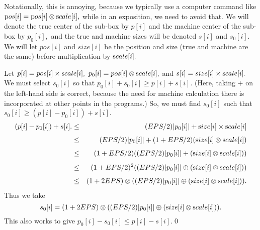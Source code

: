 Notationally, this is annoying, because we typically use a computer command like ${\textrm pos}[i] = {\textrm pos}[i] \otimes {\textrm scale}[i],$ while in an exposition, we need to avoid that.  We will denote the true center of the sub-box by $p[i]$ and the machine center of the sub-box by $p_0[i],$ and the true and machine sizes will be denoted $s[i]$ and $s_0[i].$  We will let $pos[i]$ and $size[i]$ be the position and size (true and machine are the same) before multiplication by ${\textrm scale}[i].$

Let $p[i] = pos[i] \times {\textrm scale}[i],\ p_0[i] = pos[i] \otimes {\textrm scale}[i],$ and 
$s[i]= size[i] \times {\textrm scale}[i].$  We must select $s_0[i]$ so that 
$p_0[i] + s_0[i] \ge p[i] + s[i].$  (Here, taking $+$ on the left-hand side is correct, because the need for machine calculation there is incorporated at other points in the programs.)  So, we must find $s_0[i]$ such that $s_0[i] \ge (p[i] - p_0[i]) + s[i].$
\begin{eqnarray*}
(p[i] - p_0[i]) + s[i]. &\le& (EPS/2) |p_0[i]| + {\textrm size}[i] \times {\textrm scale}[i]\\[4pt]
&\le& (EPS/2) |p_0[i]| + (1 + EPS/2) ({\textrm size}[i] \otimes
{\textrm scale}[i])\\[4pt]
&\le& (1 + EPS/2) ((EPS/2) |p_0[i]| +  ({\textrm size}[i] \otimes {\textrm scale}[i]))\\[4pt]
&\le& (1 + EPS/2)^2 ((EPS/2) |p_0[i]| \oplus  ({\textrm size}[i]
\otimes {\textrm scale}[i]))\\[4pt]
&\le& (1 + 2EPS) \otimes ((EPS/2) |p_0[i]| \oplus  ({\textrm size}[i] \otimes {\textrm scale}[i])).
\end{eqnarray*}
Thus we take 
$$s_0 [i]= (1 + 2EPS) \otimes ((EPS/2) |p_0[i]| \oplus  ({\textrm size}[i] \otimes {\textrm scale}[i])).$$
This also works to give $p_0[i] - s_0[i] \le p[i] - s[i].$\hfill\qed


 




